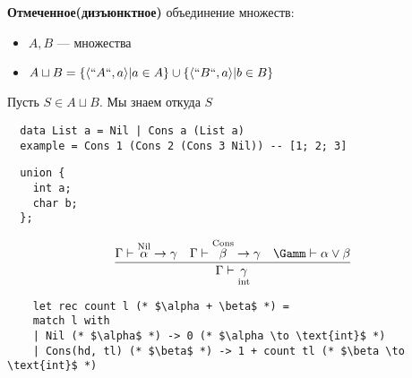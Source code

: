 \documentclass[oneside]{book}
\begin{document}
\begin{definition}
	\textbf{Отмеченное(дизъюнктное)} объединение множеств: \\
	\begin{itemize}
		\item \(A, B\) --- множества
		\item \(A \sqcup B = \{\langle ``A``, a \rangle| a\in A\}\cup\{\langle ``B``, a \rangle | b \in B\}\)
	\end{itemize}
	Пусть \(S \in A \sqcup B\). Мы знаем откуда \(S\)
\end{definition}
\begin{verbatim}
  data List a = Nil | Cons a (List a)
  example = Cons 1 (Cons 2 (Cons 3 Nil)) -- [1; 2; 3]
\end{verbatim}
\begin{verbatim}
  union {
    int a;
    char b;
  };
\end{verbatim}
\begin{examp}
	\[
		\frac{\Gamma \vdash \overset{\text{Nil}}{\alpha} \to \gamma\quad \Gamma \vdash \overset{\text{Cons}}{\beta} \to \gamma\quad \Gamm \vdash \alpha \vee \beta}{\Gamma \vdash \underset{\text{int}}{\gamma}}
	\]
	\begin{verbatim}
    let rec count l (* $\alpha + \beta$ *) =
    match l with
    | Nil (* $\alpha$ *) -> 0 (* $\alpha \to \text{int}$ *)
    | Cons(hd, tl) (* $\beta$ *) -> 1 + count tl (* $\beta \to \text{int}$ *)
  \end{verbatim}
\end{examp}
\end{document}
